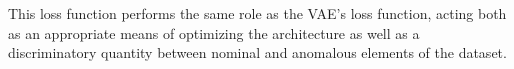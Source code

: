\documentclass[11pt, a4paper]{article}
\begin{document}

This loss function performs the same role as the VAE's loss function, acting both as an appropriate means of optimizing the architecture as well as a discriminatory quantity between nominal and anomalous elements of the dataset.



%  
%    
%    
%
%
%
\end{document}
